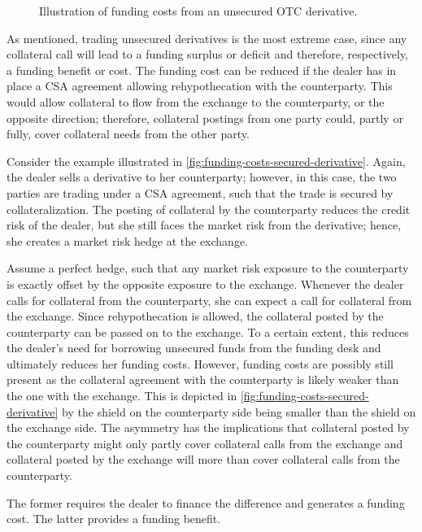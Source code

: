 \documentclass[main.tex]{subfiles}
\begin{document}
        \begin{figure}
            \centering
            \resizebox{\textwidth}{!}{%
            \begin{tikzpicture}
                
            \end{tikzpicture}        
            }   
            \caption{Illustration of funding costs from an unsecured OTC derivative.}
            \label{fig:funding-costs-unsecured-derivative}
        \end{figure}

        As mentioned, trading unsecured derivatives is the most extreme case,
        since any collateral call will lead to a funding surplus or deficit 
        and therefore, respectively, a funding benefit or cost.
        The funding cost can be reduced if the dealer has in place 
        a CSA agreement allowing rehypothecation with the counterparty.
        This would allow collateral to flow from the exchange to the counterparty, 
        or the opposite direction;
        therefore, collateral postings from one party could, partly or fully, 
        cover collateral needs from the other party.

        \begin{example}
        Consider the example illustrated in \cref{fig:funding-costs-secured-derivative}.
        Again, the dealer sells a derivative to her counterparty;
        however, in this case, the two parties are trading under a CSA agreement, 
        such that the trade is secured by collateralization.
        The posting of collateral by the counterparty reduces the credit risk of the dealer,
        but she still faces the market risk from the derivative;
        hence, she creates a market risk hedge at the exchange.
        
        Assume a perfect hedge, such that any market risk exposure to the counterparty 
        is exactly offset by the opposite exposure to the exchange.
        Whenever the dealer calls for collateral from the counterparty,
        she can expect a call for collateral from the exchange.
        Since rehypothecation is allowed,
        the collateral posted by the counterparty can be passed on to the exchange.
        To a certain extent, this reduces the dealer's need for borrowing unsecured funds from the funding desk
        and ultimately reduces her funding costs.
        However, funding costs are possibly still present as
        the collateral agreement with the counterparty is likely weaker than the one with the exchange. 
        This is depicted in \cref{fig:funding-costs-secured-derivative} 
        by the shield on the counterparty side being smaller than the shield on the exchange side.
        The asymmetry has the implications that 
        collateral posted by the counterparty might only partly cover collateral calls from the exchange 
        and collateral posted by the exchange will more than cover collateral calls from the counterparty.

        The former requires the dealer to finance the difference and generates a funding cost.
        The latter provides a funding benefit.
        \end{example}
\end{document}
